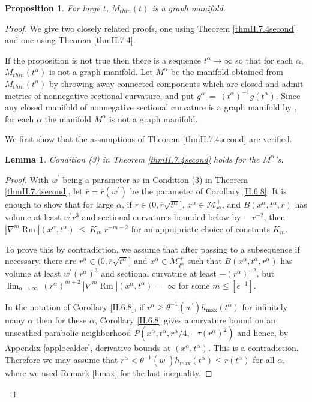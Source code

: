 \documentclass[12pt]{amsart}
\newcommand{\al}{\alpha}
\newcommand{\M}{{\mathcal M}}
\newcommand{\Rm}{\operatorname{Rm}}
\numberwithin{equation}{section}
\theoremstyle{plain}
\newtheorem{lemma}[equation]{Lemma}
\newtheorem{proposition}[equation]{Proposition}
\theoremstyle{definition}
\theoremstyle{remark}
\begin{document}
\begin{proposition} \label{thingraph}
For large $t$, $M_{thin}(t)$ is a graph manifold.
\end{proposition}
\begin{proof}
We give two closely related proofs, one using Theorem \ref{thmII.7.4second} and
one using Theorem \ref{thmII.7.4}.


If the proposition is not true then there is a sequence $t^\al \rightarrow \infty$
so that for each $\al$, $M_{thin}(t^\al)$ is not a graph manifold.  
Let $M^\al$ be the manifold obtained from  $M_{thin}(t^\al)$ 
by throwing away connected components which are closed and admit metrics
of nonnegative sectional curvature, and put $g^\al \: = \: (t^\al)^{-1} g(t^\al)$.
Since any closed manifold of nonnegative sectional curvature is a graph 
manifold by \cite{Hamiltonnnnn}, for each $\al$ the manifold $M^\al$ is not a graph
manifold.

We first show that the assumptions of Theorem \ref{thmII.7.4second} are verified.

\begin{lemma} \label{condition}
Condition (3) in Theorem \ref{thmII.7.4second} holds for the $M^\al$'s.
\end{lemma}
\begin{proof}
With $w^\prime$ being a parameter as in  
Condition (3) in Theorem \ref{thmII.7.4second},
let $\overline{r} = \overline{r}(w^\prime)$ be the parameter of Corollary \ref{II.6.8}. 
It is enough to show that for large $\al$, if $r \in (0, \overline{r} \sqrt{t^\al}]$,
$x^\al \in \M_{t^\al}^+$, and $B(x^\al, t^\al, r)$
has volume at least $w^\prime r^3$ and sectional curvatures
bounded below by $- \: r^{-2}$, then $|\nabla^m \Rm|(x^\al, t^\al) \: \le \:
K_m \: r^{-m-2}$ for an appropriate choice of constants $K_m$.

To prove this by contradiction, we  assume that after passing
to a subsequence if necessary, there are  $r^\al\in (0,\overline{r} \sqrt{t^\al}]$
and $x^\al \in \M_{t^\al}^+$ such that $B(x^\al, t^\al,r^\al)$ has 
volume
at least $w^\prime (r^\al)^3$ and sectional curvature at least 
$-(r^\al)^{-2}$, but $\lim_{\al \rightarrow \infty} \:
(r^\al)^{m+2} \: |\nabla^m \Rm|(x^\al, t^\al) \: = \:
\infty$
for some $m \le [\epsilon^{-1}]$.

In the notation of Corollary \ref{II.6.8}, if
$r^\al \ge \theta^{-1}(w^\prime) h_{\max}(t^\al)$ for infinitely many $\al$
then for these $\al$, Corollary \ref{II.6.8} gives a curvature bound on an unscathed
parabolic neighborhood 
$P \left( x^\al, t^\al, r^\al/4, - \tau (r^\al)^2 \right)$ and hence,
by Appendix \ref{applocalder}, derivative bounds at $(x^\al, t^\al)$.
This is a contradiction.  Therefore we may assume that 
$r^\al < \theta^{-1}(w^\prime) h_{\max}(t^\al) \le r(t^\al)$ for all $\al$,
where we used Remark \ref{hmax} for the last inequality.


\end{proof}
\end{proof}
\end{document}
